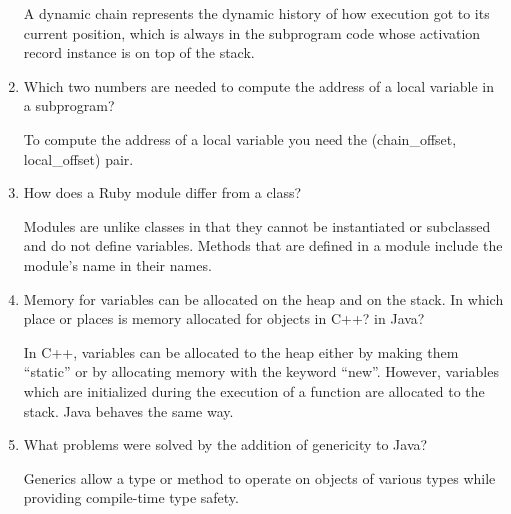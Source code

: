 \begin{enumerate}
\begin{answer}
  	A dynamic chain represents the dynamic history of how execution got to its current position, which is always in the subprogram code whose activation record instance is on top of the stack.

  \end{answer}

  \item Which two numbers are needed to compute
    the address of a local variable in a subprogram?

  \begin{answer}

  	To compute the address of a local variable you need the (chain\_offset, local\_offset) pair.

  \end{answer}

  \item How does a Ruby module differ from a class?

  \begin{answer}

  	Modules are unlike classes in that they cannot be instantiated or subclassed and do not define variables. Methods that are defined in a module include the  module’s name in their names.

  \end{answer}

  \item Memory for variables can be allocated on the heap
    and on the stack. In which place or places is memory
    allocated for objects in C++? in Java?

  \begin{answer}

  	In C++, variables can be allocated to the heap either by making them “static” or by allocating memory with the keyword “new”. However, variables which are initialized during the execution of a function are allocated to the stack. Java behaves the same way.

  \end{answer}

  \item What problems were solved by the addition
    of genericity to Java?

  \begin{answer}

  	Generics allow a type or method to operate on objects of various types while providing compile-time type safety.

  \end{answer}


\end{enumerate}
